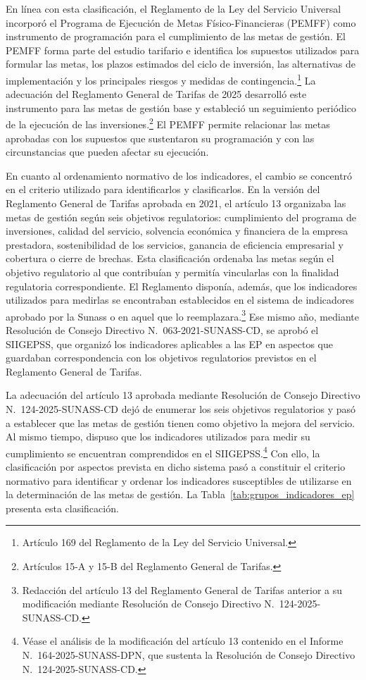 En línea con esta clasificación, el Reglamento de la Ley del Servicio Universal incorporó el Programa de Ejecución de Metas Físico-Financieras (PEMFF) como instrumento de programación para el cumplimiento de las metas de gestión. El PEMFF forma parte del estudio tarifario e identifica los supuestos utilizados para formular las metas, los plazos estimados del ciclo de inversión, las alternativas de implementación y los principales riesgos y medidas de contingencia.\footnote{Artículo 169 del Reglamento de la Ley del Servicio Universal.} La adecuación del Reglamento General de Tarifas de 2025 desarrolló este instrumento para las metas de gestión base y estableció un seguimiento periódico de la ejecución de las inversiones.\footnote{Artículos 15-A y 15-B del Reglamento General de Tarifas.} El PEMFF permite relacionar las metas aprobadas con los supuestos que sustentaron su programación y con las circunstancias que pueden afectar su ejecución.

En cuanto al ordenamiento normativo de los indicadores, el cambio se concentró en el criterio utilizado para identificarlos y clasificarlos. En la versión del Reglamento General de Tarifas aprobada en 2021, el artículo 13 organizaba las metas de gestión según seis objetivos regulatorios: cumplimiento del programa de inversiones, calidad del servicio, solvencia económica y financiera de la empresa prestadora, sostenibilidad de los servicios, ganancia de eficiencia empresarial y cobertura o cierre de brechas. Esta clasificación ordenaba las metas según el objetivo regulatorio al que contribuían y permitía vincularlas con la finalidad regulatoria correspondiente. El Reglamento disponía, además, que los indicadores utilizados para medirlas se encontraban establecidos en el sistema de indicadores aprobado por la Sunass o en aquel que lo reemplazara.\footnote{Redacción del artículo 13 del Reglamento General de Tarifas anterior a su modificación mediante Resolución de Consejo Directivo N.\textdegree~124-2025-SUNASS-CD.} Ese mismo año, mediante Resolución de Consejo Directivo N.\textdegree~063-2021-SUNASS-CD, se aprobó el SIIGEPSS, que organizó los indicadores aplicables a las EP en aspectos que guardaban correspondencia con los objetivos regulatorios previstos en el Reglamento General de Tarifas.

La adecuación del artículo 13 aprobada mediante Resolución de Consejo Directivo N.\textdegree~124-2025-SUNASS-CD dejó de enumerar los seis objetivos regulatorios y pasó a establecer que las metas de gestión tienen como objetivo la mejora del servicio. Al mismo tiempo, dispuso que los indicadores utilizados para medir su cumplimiento se encuentran comprendidos en el SIIGEPSS.\footnote{Véase el análisis de la modificación del artículo 13 contenido en el Informe N.\textdegree~164-2025-SUNASS-DPN, que sustenta la Resolución de Consejo Directivo N.\textdegree~124-2025-SUNASS-CD.} Con ello, la clasificación por aspectos prevista en dicho sistema pasó a constituir el criterio normativo para identificar y ordenar los indicadores susceptibles de utilizarse en la determinación de las metas de gestión. La Tabla~\ref{tab:grupos_indicadores_ep} presenta esta clasificación.

